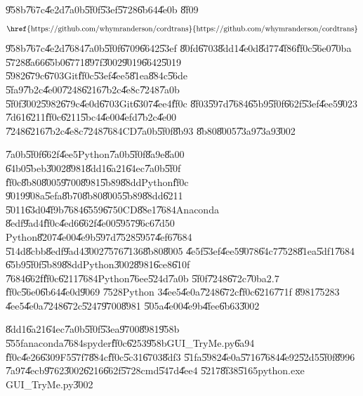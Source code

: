 \U{958b}\U{767c}\U{4e2d}\U{7a0b}\U{5f0f}\U{53ef}\U{5728}\U{6b64}\U{4e0b}%
\U{8f09}%
\begin{equation*}
\text{\href{https://github.com/whymranderson/cordtrans}{%
https://github.com/whymranderson/cordtrans}}
\end{equation*}%
\U{958b}\U{767c}\U{4e2d}\U{7684}\U{7a0b}\U{5f0f}\U{6709}\U{6642}\U{53ef}%
\U{80fd}\U{6703}\U{8dd1}\U{4e0d}\U{8d77}\U{4f86}\U{ff0c}\U{56e0}\U{70ba}%
\U{5728}\U{8a66}\U{65b0}\U{6771}\U{897f}\U{3002}\U{9019}\U{6642}\U{5019}%
\U{5982}\U{679c}\U{6703}Git\U{ff0c}\U{53ef}\U{4ee5}\U{81ea}\U{884c}\U{56de}%
\U{5fa9}\U{7b2c}\U{4e00}\U{7248}\U{6216}\U{7b2c}\U{4e8c}\U{7248}\U{7a0b}%
\U{5f0f}\U{3002}\U{5982}\U{679c}\U{4e0d}\U{6703}Git\U{6307}\U{4ee4}\U{ff0c}%
\U{8f03}\U{597d}\U{7684}\U{65b9}\U{5f0f}\U{662f}\U{53ef}\U{4ee5}\U{9023}%
\U{7d61}\U{6211}\U{ff0c}\U{6211}\U{5bc4}\U{4e00}\U{4efd}\U{7b2c}\U{4e00}%
\U{7248}\U{6216}\U{7b2c}\U{4e8c}\U{7248}\U{7684}CD\U{7a0b}\U{5f0f}\U{8b93}%
\U{8b80}\U{8005}\U{73a9}\U{73a9}\U{3002}

\U{7a0b}\U{5f0f}\U{662f}\U{4ee5}Python\U{7a0b}\U{5f0f}\U{8a9e}\U{8a00}%
\U{64b0}\U{5beb}\U{3002}\U{8981}\U{8dd1}\U{6a21}\U{64ec}\U{7a0b}\U{5f0f}%
\U{ff0c}\U{8b80}\U{8005}\U{9700}\U{8981}\U{5b89}\U{88dd}Python\U{ff0c}%
\U{9019}\U{908a}\U{5efa}\U{8b70}\U{8b80}\U{8005}\U{5b89}\U{88dd}\U{6211}%
\U{5011}\U{63d0}\U{4f9b}\U{7684}\U{6559}\U{6750}CD\U{88e1}\U{7684}Anaconda%
\U{8edf}\U{9ad4}\U{ff0c}\U{4ed6}\U{662f}\U{4e00}\U{5957}\U{96c6}\U{7d50}%
Python\U{8207}\U{4e00}\U{4e9b}\U{597d}\U{7528}\U{5957}\U{4ef6}\U{7684}%
\U{514d}\U{8cbb}\U{8edf}\U{9ad4}\U{3002}\U{7576}\U{7136}\U{8b80}\U{8005}%
\U{4e5f}\U{53ef}\U{4ee5}\U{9078}\U{64c7}\U{7528}\U{81ea}\U{5df1}\U{7684}%
\U{65b9}\U{5f0f}\U{5b89}\U{88dd}Python\U{3002}\U{8981}\U{6ce8}\U{610f}%
\U{7684}\U{662f}\U{ff0c}\U{6211}\U{7684}Python\U{76ee}\U{524d}\U{7a0b}%
\U{5f0f}\U{7248}\U{672c}\U{70ba}$2.7$\U{ff0c}\U{56e0}\U{6b64}\U{4e0d}\U{9069}%
\U{7528}Python $3$\U{4ee5}\U{4e0a}\U{7248}\U{672c}\U{ff0c}\U{6216}\U{771f}%
\U{8981}\U{7528}$3$\U{4ee5}\U{4e0a}\U{7248}\U{672c}\U{5247}\U{9700}\U{8981}%
\U{505a}\U{4e00}\U{4e9b}\U{4fee}\U{6b63}\U{3002}

\U{8dd1}\U{6a21}\U{64ec}\U{7a0b}\U{5f0f}\U{53ea}\U{9700}\U{8981}\U{958b}%
\U{555f}anaconda\U{7684}spyder\U{ff0c}\U{6253}\U{958b}GUI\_TryMe.py\U{6a94}%
\U{ff0c}\U{4e26}\U{6309}F5\U{57f7}\U{884c}\U{ff0c}\U{5c31}\U{6703}\U{8df3}%
\U{51fa}\U{5982}\U{4e0a}\U{5716}\U{7684}\U{4e92}\U{52d5}\U{5f0f}\U{8996}%
\U{7a97}\U{4ecb}\U{9762}\U{3002}\U{6216}\U{662f}\U{5728}cmd\U{547d}\U{4ee4}%
\U{5217}\U{8f38}\U{5165}python.exe GUI\_TryMe.py\U{3002}

